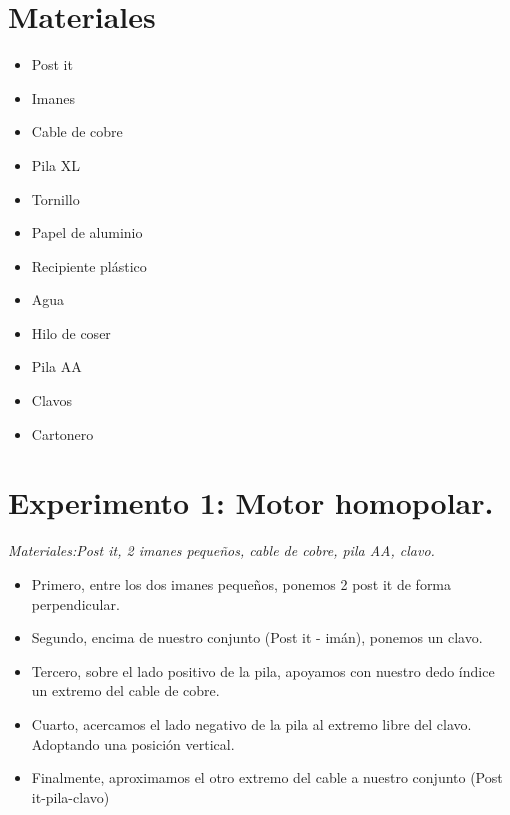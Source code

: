 \documentclass[]{article}
\begin{document}
\begin{multicols*}{2}
\section*{Materiales}

\begin{multicols*}{2}
\begin{itemize}
    \item Post it
    \item Imanes%
    \item Cable de cobre
    \item Pila XL
    \item Tornillo
    \item Papel de aluminio
    \item Recipiente plástico
    \item Agua
    \item Hilo de coser
    \item Pila AA
    \item Clavos
    \item Cartonero
\end{itemize}
\end{multicols*}




\section*{Experimento 1: Motor homopolar.}
\textit{Materiales:Post it, 2 imanes pequeños, cable de cobre, pila AA, clavo.}

\vspace{-\topsep}
\begin{itemize}
    \setlength{\parskip}{0pt} 
    \setlength{\itemsep}{0pt plus 1pt}
    \item Primero, entre los dos imanes pequeños, ponemos 2 post it de forma perpendicular.
    \item Segundo, encima de nuestro conjunto (Post it - imán), ponemos un clavo.
    \item Tercero, sobre  el lado positivo de la pila, apoyamos con nuestro dedo índice un extremo del cable de cobre.
    \item Cuarto,  acercamos el lado negativo de la pila al  extremo libre del clavo. Adoptando una posición vertical.
    \item Finalmente, aproximamos el otro extremo del cable a nuestro conjunto (Post it-pila-clavo) 
\end{itemize}
\vspace{-\topsep}


\end{multicols*}
\end{document}

